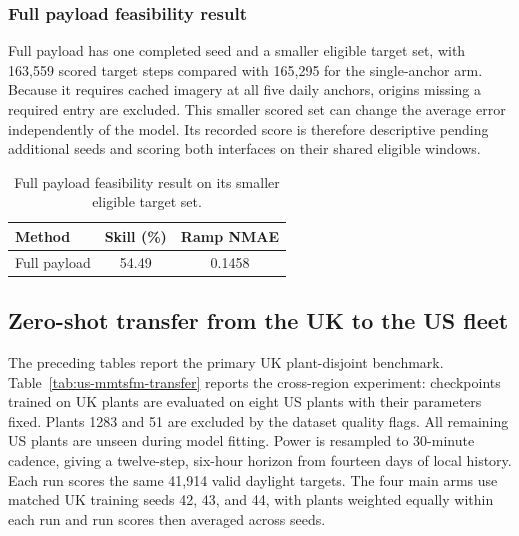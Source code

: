 \subsubsection{Full payload feasibility result}

Full payload has one completed seed and a smaller eligible target set, with 163,559 scored target steps compared with 165,295 for the single-anchor arm. Because it requires cached imagery at all five daily anchors, origins missing a required entry are excluded. This smaller scored set can change the average error independently of the model. Its recorded score is therefore descriptive pending additional seeds and scoring both interfaces on their shared eligible windows.

\begin{table}[htbp]\centering
\begin{tabular}{lcc}\hline
Method & Skill (\%) & Ramp NMAE \\\hline
Full payload & 54.49 & 0.1458 \\\hline
\end{tabular}
\caption{Full payload feasibility result on its smaller eligible target set.}\label{tab:results-full-payload}
\end{table}

\subsection{Zero-shot transfer from the UK to the US fleet}

The preceding tables report the primary UK plant-disjoint benchmark. Table~\ref{tab:us-mmtsfm-transfer} reports the cross-region experiment: checkpoints trained on UK plants are evaluated on eight US plants with their parameters fixed. Plants 1283 and 51 are excluded by the dataset quality flags. All remaining US plants are unseen during model fitting. Power is resampled to 30-minute cadence, giving a twelve-step, six-hour horizon from fourteen days of local history. Each run scores the same 41,914 valid daylight targets. The four main arms use matched UK training seeds 42, 43, and 44, with plants weighted equally within each run and run scores then averaged across seeds.


